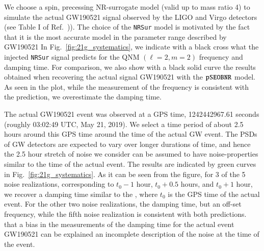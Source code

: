 We choose a spin, precessing NR-surrogate model  (valid up to mass ratio 4) to simulate the actual GW190521 signal
observed by the LIGO and Virgo detectors~\cite{Abbott:2020tfl} (see
Table I of Ref.~\cite{Abbott:2020tfl})). The choice of the
\texttt{NRSur} model is motivated by the fact that it is the most
accurate model in the parameter range described by GW190521 In
Fig.~\ref{fig:21g_systematics}, we indicate with a black cross  what
the injected \texttt{NRSur} signal predicts for the QNM $(\ell=2,m=2)$
frequency and damping time. For comparison, we also show with a
black solid curve the results obtained when recovering the actual
signal GW190521 with the $\texttt{pSEOBNR}$ model. As seen in the plot,
while the measurement of the frequency is consistent with the
prediction, we overestimate the damping time.

The actual GW190521 event was observed at a GPS time, 1242442967.61
seconds (roughly 03:02:49 UTC, May 21, 2019). We select a time period
of about 2.5 hours around this GPS time around the time of the actual GW event. The
PSDs of GW detectors are expected to vary over longer durations of
time, and hence the 2.5 hour stretch of noise we consider can be
assumed to have noise-properties similar to the time of the actual
event.  The results are indicated by green curves in
Fig.~\ref{fig:21g_systematics}. As it can be seen from the figure, for
3 of the 5 noise realizations, corresponding to $t_0-1$ hour,
$t_0+0.5$ hours, and $t_0+1$ hour, we recover a damping time similar to
the , where $t_0$ is the GPS time of the actual event. For
the other two noise realizations,  the damping time, but  an off-set frequency, 
while the fifth noise realization is consistent with both predictions.  
 that a bias in the measurements of the damping time 
for the actual event GW190521 can be explained  an incomplete 
description of the noise at the time of the event.

